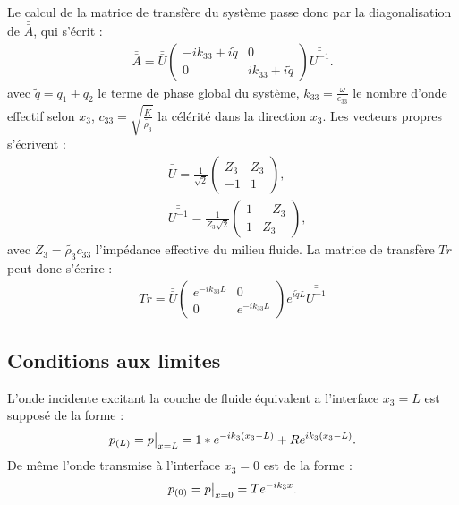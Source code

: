 \documentclass[12pt]{report}
\begin{document}
    Le calcul de la matrice de transfère du système passe donc par la diagonalisation de $\bar{\bar{A}}$, qui s'écrit :
    \begin{align}
    \bar{\bar{A}}=\bar{\bar{U}} \begin{pmatrix}
    								-ik_{33}+i\tilde{q} & 0 \\ 0 & ik_{33}+i\tilde{q} 
    							\end{pmatrix} \bar{\bar{U^{-1}}}.
    \end{align}
    avec $\tilde{q}=q_1+q_2$ le terme de phase global du système, $k_{33}=\frac{\omega}{c_{33}}$ le nombre d'onde effectif selon $x_3$, $c_{33}=\sqrt{\frac{\tilde{K}}{\tilde{\rho_3}}}$ la célérité dans la direction $x_3$.
    Les vecteurs propres s'écrivent :
    \begin{align}
    &\bar{\bar{U}}=\frac{1}{\sqrt{2}}\begin{pmatrix}
    					Z_3 & Z_3 \\ -1 & 1
    								\end{pmatrix},\\
    &\bar{\bar{U^{-1}}}=\frac{1}{Z_3 \sqrt{2}}\begin{pmatrix}
    					1 & -Z_3 \\ 1 & Z_3
    		   						\end{pmatrix},           
    \end{align}
    avec $Z_3=\tilde{\rho_3}c_{33}$ l'impédance effective du milieu fluide.
    La matrice de transfère $Tr$ peut donc s'écrire :
        \begin{align}
    Tr=\bar{\bar{U}}\begin{pmatrix}
    e^{-ik_{33}L} & 0 \\ 0 & e^{-ik_{33}L} 
    \end{pmatrix} e^{i\tilde{q}L}\bar{\bar{U^{-1}}}\label{Matrice_Transfere}
    \end{align}

\subsection{Conditions aux limites}
\label{Ch_Prop_S_Pb_SS_BC}
    L'onde incidente excitant la couche de fluide équivalent a l'interface $x_3=L$ est supposé de la forme :
    \begin{align}
    p_{(L)}=p\big{|}_{x=L}=1*e^{-i k_3(x_3-L)}+R e^{i k_3(x_3-L)}.
    \end{align}
    De même l'onde transmise à l'interface $x_3=0$ est de la forme : 
    \begin{align}
    p_{(0)}=p\big{|}_{x=0}=Te^{-ik_3x}.
    \end{align}
\end{document}
